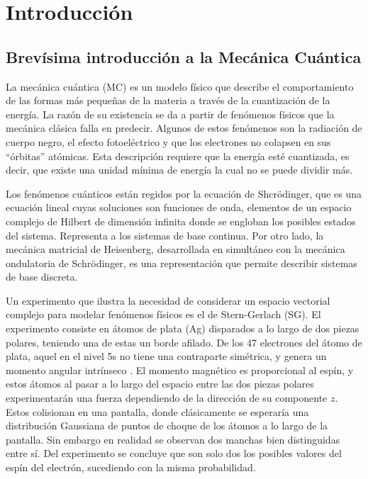 \chapter{Introducci\'on}

\section{Brevísima introducción a la Mecánica Cuántica}

La mecánica cuántica (MC) es un modelo físico que describe el comportamiento de las formas más pequeñas de la materia a través de la cuantización de la energía. La razón de su existencia se da a partir de fenómenos físicos que la mecánica clásica falla en predecir. Algunos de estos fenómenos son la radiación de cuerpo negro, el efecto fotoeléctrico y que los electrones no colapsen en sus ``órbitas'' atómicas. Esta descripción requiere que la energía esté cuantizada, es decir, que existe una unidad mínima de energía la cual no se puede dividir más.

Los fenómenos cuánticos están regidos por la ecuación de Shcrödinger, que es una ecuación lineal cuyas soluciones son funciones de onda, elementos de un espacio complejo de Hilbert de dimensión infinita donde se engloban los posibles estados del sistema. Representa a los sistemas de base continua. Por otro lado, la mecánica matricial de Heisenberg, desarrollada en simultáneo con la mecánica ondulatoria de Schrödinger, es una representación que permite describir sistemas de base discreta.

Un experimento que ilustra la necesidad de considerar un espacio vectorial complejo para modelar fenómenos físicos es el de Stern-Gerlach (SG). El experimento consiste en átomos de plata (Ag) disparados a lo largo de dos piezas polares, teniendo una de estas un borde afilado. De los 47 electrones del átomo de plata, aquel en el nivel 5s no tiene una contraparte simétrica, y genera un momento angular intrínseco \cite{Sakurai}. El momento magnético es proporcional al espín, y estos átomos al pasar a lo largo del espacio entre las dos piezas polares experimentarán una fuerza dependiendo de la dirección de su componente $z$. Estos colisionan en una pantalla, donde clásicamente se esperaría una distribución Gaussiana de puntos de choque de los átomos a lo largo de la pantalla. Sin embargo en realidad se observan dos manchas bien distinguidas entre sí. Del experimento se concluye que son solo dos los posibles valores del espín del electrón, sucediendo con la misma probabilidad.

